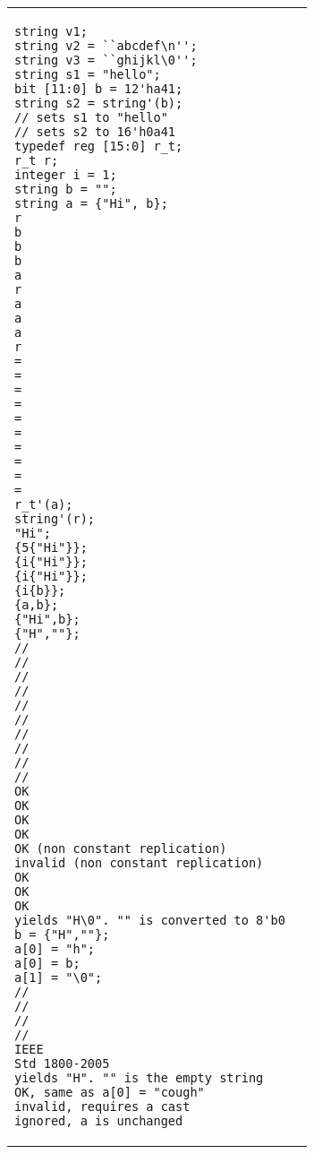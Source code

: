\begin{table}
\begin{tabular}{p{} p{}}
\begin{lstlisting}[label=dt!literal!struct, caption=Structure Literals]
string v1;
string v2 = ``abcdef\n'';
string v3 = ``ghijkl\0'';
string s1 = "hello";
bit [11:0] b = 12'ha41;
string s2 = string'(b);
// sets s1 to "hello"
// sets s2 to 16'h0a41
typedef reg [15:0] r_t;
r_t r;
integer i = 1;
string b = "";
string a = {"Hi", b};
r
b
b
b
a
r
a
a
a
r
=
=
=
=
=
=
=
=
=
=
r_t'(a);
string'(r);
"Hi";
{5{"Hi"}};
{i{"Hi"}};
{i{"Hi"}};
{i{b}};
{a,b};
{"Hi",b};
{"H",""};
//
//
//
//
//
//
//
//
//
//
OK
OK
OK
OK
OK (non constant replication)
invalid (non constant replication)
OK
OK
OK
yields "H\0". "" is converted to 8'b0
b = {"H",""};
a[0] = "h";
a[0] = b;
a[1] = "\0";
//
//
//
//
IEEE
Std 1800-2005
yields "H". "" is the empty string
OK, same as a[0] = "cough"
invalid, requires a cast
ignored, a is unchanged
\end{lstlisting}
&
\begin{tbldesc}
\begin{verbatim}


\end{verbatim}
\end{tbldesc}
\end{tabular}
\end{table}
